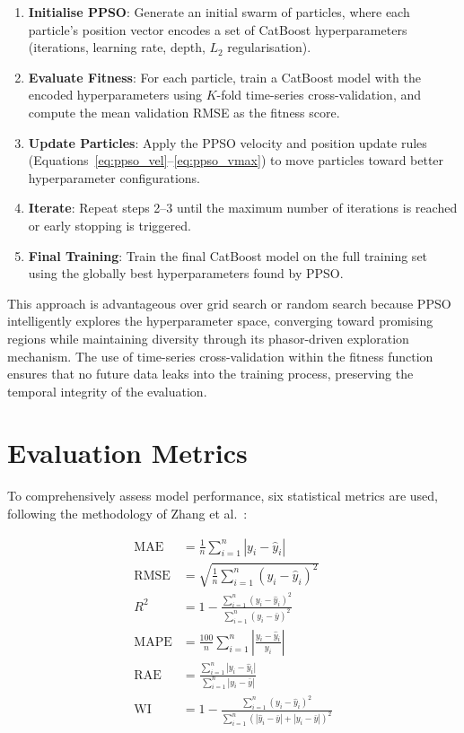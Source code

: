 \begin{enumerate}
    \item \textbf{Initialise PPSO}: Generate an initial swarm of particles, where each particle's position vector encodes a set of CatBoost hyperparameters (iterations, learning rate, depth, $L_2$ regularisation).
    \item \textbf{Evaluate Fitness}: For each particle, train a CatBoost model with the encoded hyperparameters using $K$-fold time-series cross-validation, and compute the mean validation RMSE as the fitness score.
    \item \textbf{Update Particles}: Apply the PPSO velocity and position update rules (Equations~\ref{eq:ppso_vel}--\ref{eq:ppso_vmax}) to move particles toward better hyperparameter configurations.
    \item \textbf{Iterate}: Repeat steps 2--3 until the maximum number of iterations is reached or early stopping is triggered.
    \item \textbf{Final Training}: Train the final CatBoost model on the full training set using the globally best hyperparameters found by PPSO.
\end{enumerate}

This approach is advantageous over grid search or random search because PPSO intelligently explores the hyperparameter space, converging toward promising regions while maintaining diversity through its phasor-driven exploration mechanism. The use of time-series cross-validation within the fitness function ensures that no future data leaks into the training process, preserving the temporal integrity of the evaluation.


\section{Evaluation Metrics}\label{sec:eval_metrics}

To comprehensively assess model performance, six statistical metrics are used, following the methodology of Zhang et al.\ \parencite{zhang2023catboostppso}:

\begin{align}
    \text{MAE} &= \frac{1}{n}\sum_{i=1}^{n} |y_i - \hat{y}_i| \label{eq:mae} \\[6pt]
    \text{RMSE} &= \sqrt{\frac{1}{n}\sum_{i=1}^{n}(y_i - \hat{y}_i)^2} \label{eq:rmse} \\[6pt]
    R^2 &= 1 - \frac{\sum_{i=1}^{n}(y_i - \hat{y}_i)^2}{\sum_{i=1}^{n}(y_i - \bar{y})^2} \label{eq:r2} \\[6pt]
    \text{MAPE} &= \frac{100}{n}\sum_{i=1}^{n}\left|\frac{y_i - \hat{y}_i}{y_i}\right| \label{eq:mape} \\[6pt]
    \text{RAE} &= \frac{\sum_{i=1}^{n}|y_i - \hat{y}_i|}{\sum_{i=1}^{n}|y_i - \bar{y}|} \label{eq:rae} \\[6pt]
    \text{WI} &= 1 - \frac{\sum_{i=1}^{n}(y_i - \hat{y}_i)^2}{\sum_{i=1}^{n}(|\hat{y}_i - \bar{y}| + |y_i - \bar{y}|)^2} \label{eq:wi}
\end{align}

